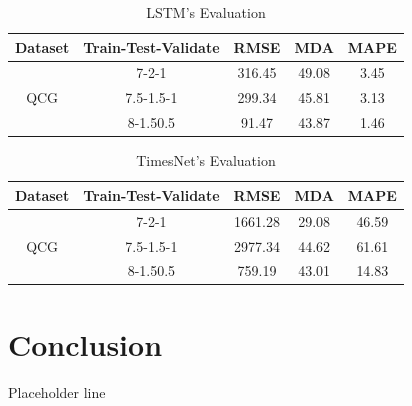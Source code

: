 \documentclass{ieeeojies}
\begin{document}
\begin{table}[H]
  \begin{tabular}{|c|c|c|c|c|}
  \hline
  \multicolumn{1}{|l|}{Dataset} & \multicolumn{1}{l|}{Train-Test-Validate} & \multicolumn{1}{l|}{RMSE} & \multicolumn{1}{l|}{MDA} & \multicolumn{1}{l|}{MAPE} \\ \hline
  \multirow{3}{*}{QCG}          & 7-2-1                                    & 316.45                    & 49.08                    & 3.45                      \\ \cline{2-5} 
                                & 7.5-1.5-1                                & 299.34                    & 45.81                    & 3.13                      \\ \cline{2-5} 
                                & 8-1.50.5                                 & 91.47                    & 43.87                    & 1.46                      \\ \hline
  \end{tabular}
  \caption{LSTM's Evaluation}
    \label{vcbresult}
  \end{table}

  \begin{table}[H]
    \begin{tabular}{|c|c|c|c|c|}
    \hline
    \multicolumn{1}{|l|}{Dataset} & \multicolumn{1}{l|}{Train-Test-Validate} & \multicolumn{1}{l|}{RMSE} & \multicolumn{1}{l|}{MDA} & \multicolumn{1}{l|}{MAPE} \\ \hline
    \multirow{3}{*}{QCG}          & 7-2-1                                    & 1661.28                    & 29.08                    & 46.59                     \\ \cline{2-5} 
                                  & 7.5-1.5-1                                & 2977.34                   & 44.62                    & 61.61                      \\ \cline{2-5} 
                                  & 8-1.50.5                                 & 759.19                    & 43.01                    & 14.83                      \\ \hline
    \end{tabular}
    \caption{TimesNet's Evaluation}
      \label{vcbresult}
    \end{table}

\section{Conclusion}
 Placeholder line
\end{document}
